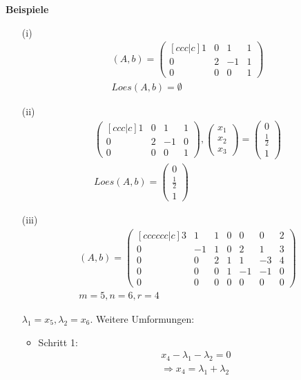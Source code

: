 \documentclass[11pt]{report}
\newcommand*\f[1] {\textbf{#1}}
\begin{document}
\f{Beispiele}
\begin{itemize}
 \item[(i)] 
\begin{align}
 (A, b) =
\begin{pmatrix}[ccc|c]
1 & 0 & 1 & 1  \\
0 & 2 & -1 & 1 \\
0 & 0 & 0 & 1 
\end{pmatrix} \\
Loes(A, b) = \emptyset
\end{align}

 \item[(ii)]
\begin{align}
\begin{pmatrix}[ccc|c]
1 & 0 & 1 & 1  \\
0 & 2 & -1 & 0 \\
0 & 0 & 0 & 1 
\end{pmatrix}
,
\begin{pmatrix}
x_1 \\
x_2 \\
x_3  
\end{pmatrix} =
\begin{pmatrix}
0 \\
\frac{1}{2} \\
1
\end{pmatrix} \\
Loes(A, b) = 
\begin{pmatrix}
0 \\
\frac{1}{2} \\
1
\end{pmatrix}
\end{align}

\item[(iii)]
\begin{align}
(A, b) = \begin{pmatrix}[cccccc|c]
3 & 1 & 1 & 0 & 0 & 0 & 2 \\
0 & -1 & 1 & 0 & 2 & 1 & 3 \\
0 & 0 & 2 & 1 & 1 & -3 & 4 \\
0 & 0 & 0 & 1 & -1 & -1 & 0 \\
0 & 0 & 0 & 0 & 0 & 0 & 0 
\end{pmatrix} \\
m = 5, n = 6, r = 4
\end{align}

$\lambda_1 = x_5, \lambda_2 = x_6$. Weitere Umformungen:
\begin{itemize}
\item Schritt 1:
\begin{align}
 x_4 - \lambda_1 - \lambda_2 = 0 \\
 \Rightarrow x_4 = \lambda_1 + \lambda_2
\end{align}


\end{itemize}
\end{itemize}
\end{document}
